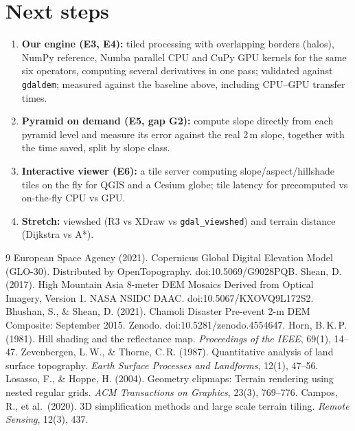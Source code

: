 ﻿\documentclass[11pt,a4paper]{article}
\begin{document}
\section{Next steps}
\begin{enumerate}
  \item \textbf{Our engine (E3, E4):} tiled processing with overlapping borders (halos), NumPy reference, Numba
  parallel CPU and CuPy GPU kernels for the same six operators, computing several derivatives in one pass; validated
  against \texttt{gdaldem}; measured against the baseline above, including CPU--GPU transfer times.
  \item \textbf{Pyramid on demand (E5, gap G2):} compute slope directly from each pyramid level and measure its error
  against the real 2\,m slope, together with the time saved, split by slope class.
  \item \textbf{Interactive viewer (E6):} a tile server computing slope/aspect/hillshade tiles on the fly for QGIS
  and a Cesium globe; tile latency for precomputed vs on-the-fly CPU vs GPU.
  \item \textbf{Stretch:} viewshed (R3 vs XDraw vs \texttt{gdal\_viewshed}) and terrain distance (Dijkstra vs A*).
\end{enumerate}

\begin{thebibliography}{9}\small
{} European Space Agency (2021). Copernicus Global Digital Elevation Model (GLO-30). Distributed by
OpenTopography. doi:10.5069/G9028PQB.
 Shean, D. (2017). High Mountain Asia 8-meter DEM Mosaics Derived from Optical Imagery, Version 1.
NASA NSIDC DAAC. doi:10.5067/KXOVQ9L172S2.
 Bhushan, S., \& Shean, D. (2021). Chamoli Disaster Pre-event 2-m DEM Composite: September 2015.
Zenodo. doi:10.5281/zenodo.4554647.
 Horn, B.\,K.\,P. (1981). Hill shading and the reflectance map. \emph{Proceedings of the IEEE},
69(1), 14--47.
 Zevenbergen, L.\,W., \& Thorne, C.\,R. (1987). Quantitative analysis of land surface topography.
\emph{Earth Surface Processes and Landforms}, 12(1), 47--56.
 Losasso, F., \& Hoppe, H. (2004). Geometry clipmaps: Terrain rendering using nested regular
grids. \emph{ACM Transactions on Graphics}, 23(3), 769--776.
 Campos, R., et al.\ (2020). 3D simplification methods and large scale terrain tiling.
\emph{Remote Sensing}, 12(3), 437.
\end{thebibliography}
\end{document}
